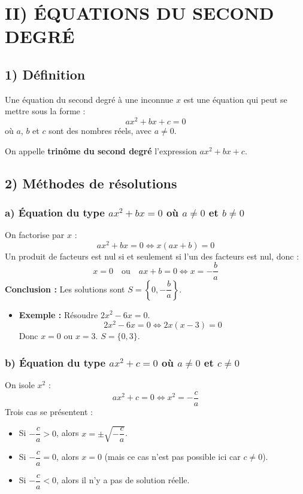 \documentclass[12pt,a4paper]{article}
\newcounter{solution}
\begin{document}
\vspace{1em}
\section*{\color{myred} II) ÉQUATIONS DU SECOND DEGRÉ}

\subsection*{\color{myred} 1) Définition}
Une équation du second degré à une inconnue $x$ est une équation qui peut se mettre sous la forme :
\[
ax^2 + bx + c = 0
\]
où $a$, $b$ et $c$ sont des nombres réels, avec $a \neq 0$.

On appelle \textbf{trinôme du second degré} l'expression $ax^2 + bx + c$.

\subsection*{\color{myred} 2) Méthodes de résolutions}

\subsubsection*{\color{myred} a) Équation du type $ax^2 + bx = 0$ où $a \neq 0$ et $b \neq 0$}
On factorise par $x$ :
\[
ax^2 + bx = 0 \iff x(ax + b) = 0
\]
Un produit de facteurs est nul si et seulement si l'un des facteurs est nul, donc :
\[
x = 0 \quad \text{ou} \quad ax + b = 0 \iff x = -\frac{b}{a}
\]
\textbf{Conclusion :} Les solutions sont $S = \left\{0, -\dfrac{b}{a}\right\}$.

\begin{itemize}
    \item \textbf{Exemple :} Résoudre $2x^2 - 6x = 0$.
    \[
    2x^2 - 6x = 0 \iff 2x(x-3) = 0
    \]
    Donc $x=0$ ou $x=3$. \quad $S = \{0, 3\}$.
\end{itemize}

\subsubsection*{\color{myred} b) Équation du type $ax^2 + c = 0$ où $a \neq 0$ et $c \neq 0$}
On isole $x^2$ :
\[
ax^2 + c = 0 \iff x^2 = -\frac{c}{a}
\]
Trois cas se présentent :
\begin{itemize}
    \item Si $-\dfrac{c}{a} > 0$, alors $x = \pm \sqrt{-\dfrac{c}{a}}$.
    \item Si $-\dfrac{c}{a} = 0$, alors $x = 0$ (mais ce cas n'est pas possible ici car $c \neq 0$).
    \item Si $-\dfrac{c}{a} < 0$, alors il n'y a pas de solution réelle.
\end{itemize}
\end{document}
